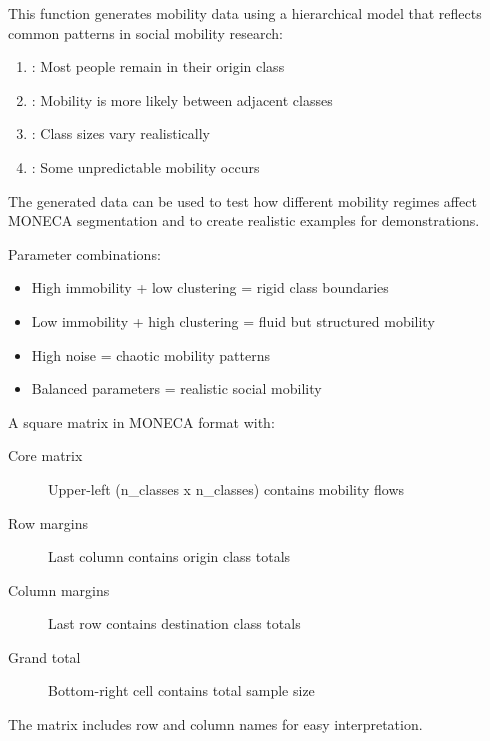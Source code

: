 \documentclass[a4paper]{book}
\begin{document}
\begin{Details}
This function generates mobility data using a hierarchical model that reflects
common patterns in social mobility research:

\begin{enumerate}

\item{} : Most people remain in their origin class
\item{} : Mobility is more likely between adjacent classes
\item{} : Class sizes vary realistically
\item{} : Some unpredictable mobility occurs

\end{enumerate}


The generated data can be used to test how different mobility regimes affect
MONECA segmentation and to create realistic examples for demonstrations.

Parameter combinations:
\begin{itemize}

\item{} High immobility + low clustering = rigid class boundaries
\item{} Low immobility + high clustering = fluid but structured mobility
\item{} High noise = chaotic mobility patterns
\item{} Balanced parameters = realistic social mobility

\end{itemize}

\end{Details}
%
\begin{Value}
A square matrix in MONECA format with:
\begin{description}

\item[Core matrix] Upper-left (n\_classes x n\_classes) contains mobility flows
\item[Row margins] Last column contains origin class totals
\item[Column margins] Last row contains destination class totals
\item[Grand total] Bottom-right cell contains total sample size

\end{description}

The matrix includes row and column names for easy interpretation.
\end{Value}
\end{document}
